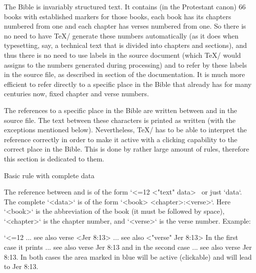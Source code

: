 The Bible is invariably
structured text. It contains (in the Protestant canon) 66 books with established markers for those books,
each book has its chapters numbered from one and each chapter has verses
numbered from one. So there is no need to have \TeX/ generate these numbers
automatically (as it does when typesetting, say, a technical text that is divided into
chapters and sections), and thus there is no need to use labels in the source
document (which \TeX/ would assigns to the numbers generated during processing) and to refer by these labels in the source file, 
as described in section  of the 
 documentation. 
It is much more efficient to refer directly to a specific place in the Bible that already has
for many centuries now,  fixed chapter and verse numbers.


 
 
The references to a specific place in the Bible are written between \code{<} and \code{>} in the source file.
The text between these characters is printed as written (with the exceptions mentioned below). 
Nevertheless, \TeX/ has to be able to interpret the reference correctly in order to
make it active with a clicking capability to the correct place in the Bible. This is done by
rather large amount of rules, therefore this section is dedicated to them.


\secc[uudaj] Basic rule with complete data

The reference between \code{<} and \code{>} is of the form 
\begtt\catcode`<=12
<"text" data>
\endtt
\ or just \code{<}`data`\code{>}. 
The complete `<data>` is of the form `<book> <chapter>:<verse>`. Here `<book>` is the abbreviation of the book (it must be followed by
space), `<chapter>` is the chapter number, and `<verse>` is the verse number.
Example:

\begtt \catcode`<=12
... see also verse <Jer 8:13>
... see also <"verse" Jer 8:13>
\endtt
In the first case it prints ... see also verse {\Blue Jer 8:13} and in the second case
... see also {\Blue verse Jer 8:13}. 
In both cases the area marked in blue will be active (clickable) and will lead to Jer 8:13.


